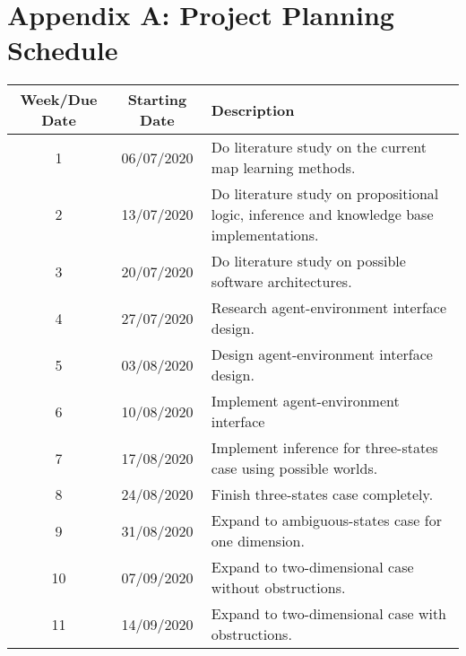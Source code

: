 \setcounter{table}{0}
\renewcommand{\thetable}{A.\arabic{table}}

\chapter{Appendix A:  Project Planning Schedule}

 \begin{table}[H]
  \begin{center}
    \begin{tabular}{|c|c|p{8cm}|} 
    \hline
      \textbf{Week/Due Date} & \textbf{Starting Date} & \textbf{Description}\\
      \hline
      \hline
      1 & 06/07/2020 & Do literature study on the current map learning methods.\\ \hline
      
      2 & 13/07/2020 & Do literature study on propositional logic, 
      inference and knowledge base implementations.\\ \hline
      
      3 & 20/07/2020 & Do literature study on possible software architectures.\\ \hline
      
      4 & 27/07/2020 &  Research agent-environment interface design. \\ \hline
      
      5  & 03/08/2020 & Design agent-environment interface design.  \\ \hline
      
      6 & 10/08/2020 & Implement agent-environment interface\\ \hline
      
      7 & 17/08/2020 & Implement inference for three-states case using possible worlds. \\ \hline
      
      8 & 24/08/2020 & Finish three-states case completely.\\ \hline
      
      9 & 31/08/2020 & Expand to ambiguous-states case for one dimension.\\ \hline
      
      10 & 07/09/2020 & Expand to two-dimensional case without obstructions.\\ \hline
      
      11 & 14/09/2020 & Expand to two-dimensional case with obstructions.\\ \hline
      

\end{tabular}
\end{center}
\end{table}
